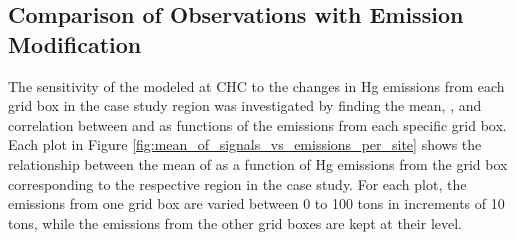 \subsection{Comparison of Observations with Emission Modification}\label{c3_obs_v_modifications}
\begin{flushleft}
The sensitivity of the modeled \hgc at CHC to the changes in Hg emissions from each grid box in the case study region was investigated by finding the mean, \iq, and correlation between \modelc and \obsC as functions of the emissions from each specific grid box. Each plot in Figure \ref{fig:mean_of_signals_vs_emissions_per_site} shows the relationship between the mean of \modelc as a function of Hg emissions from the grid box corresponding to the respective region in the case study. For each plot, the emissions from one grid box are varied between  0 to 100 tons in increments of 10 tons, while the emissions from the other grid boxes are kept at their \on level. 
\end{flushleft}

